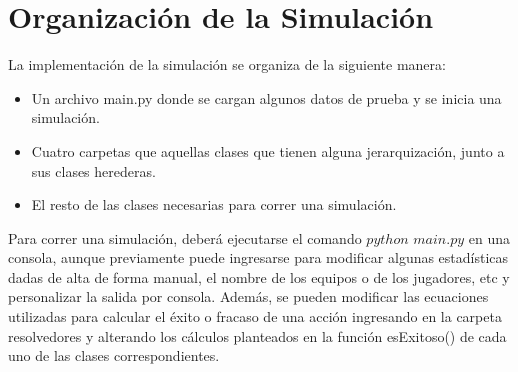 \section{Organización de la Simulación}
La implementación de la simulación se organiza de la siguiente manera:
\begin{itemize}
 \item Un archivo main.py donde se cargan algunos datos de prueba y se inicia una simulación.
 \item Cuatro carpetas que aquellas clases que tienen alguna jerarquización, junto a sus clases herederas.
 \item El resto de las clases necesarias para correr una simulación.
\end{itemize}

Para correr una simulación, deberá ejecutarse el comando $python$ $main.py$ en una consola, aunque previamente puede ingresarse para modificar algunas estadísticas dadas de alta de forma manual, el nombre de los equipos o de los jugadores, etc y personalizar la salida por consola.
Además, se pueden modificar las ecuaciones utilizadas para calcular el éxito o fracaso de una acción ingresando en la carpeta resolvedores y alterando los cálculos planteados en la función esExitoso() de cada uno de las clases correspondientes. 
